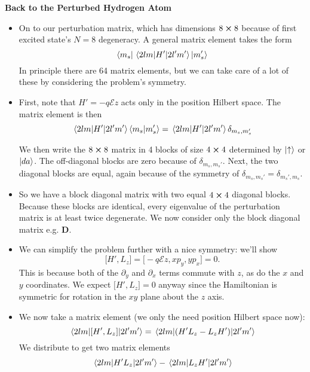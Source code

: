 \documentclass[11pt, a4paper]{article}
\newcommand{\Ham}{Hamiltonian\xspace}
\newcommand{\mat}[1]{\mathbf{#1}} %
\newcommand{\E}{\mathcal{E}}  %
\newcommand{\ua}{\uparrow}  %
\begin{document}
\textbf{Back to the Perturbed Hydrogen Atom}
\begin{itemize}
	\item On to our perturbation matrix, which has dimensions $ 8 \cross 8 $ because of first excited state's $ N = 8 $ degeneracy. A general matrix element takes the form
	\begin{equation*}
		\bra{m_{s}} \mel{2lm}{H'}{2l'm'} \ket{m_{s}'}
	\end{equation*}
	In principle there are 64 matrix elements, but we can take care of a lot of these by considering the problem's symmetry. 
	
	\item First, note that $ H' = - q \E z $ acts only in the position Hilbert space. The matrix element is then
	\begin{equation*}
		\mel{2lm}{H'}{2l'm'}\braket{m_{s}}{m_{s}'} = \mel{2lm}{H'}{2l'm'} \delta_{m_{s}, m_{s}'}
	\end{equation*}
	
	We then write the $ 8 \cross 8 $ matrix in 4 blocks  of size $ 4 \cross 4 $ determined by $ \ket{\ua} $ or $ \ket{da} $. The off-diagonal blocks are zero because of $ \delta_{m_{s}, m_{s}'} $. Next, the two diagonal blocks are equal, again because of the symmetry of $ \delta_{m_{s}, m_{s}'} = \delta_{m_{s}', m_{s}}$. 
	
	\item So we have a block diagonal matrix with two equal $ 4 \cross 4 $ diagonal blocks. Because these blocks are identical, every eigenvalue of the perturbation matrix is at least twice degenerate. We now consider only the block diagonal matrix e.g. $ \mat{D} $. 
	
	\item We can simplify the problem further with a nice symmetry: we'll show
	\begin{equation*}
		\big[H', L_{z}\big] = \big[- q \E z, xp_{y}, yp_{x}\big] = 0.
	\end{equation*}
	This is because both of the $ \partial_{y} $ and $ \partial_{x} $ terms commute with $ z $, as do the $ x $ and $ y $ coordinates. We expect $ \big[H', L_{z}\big] = 0 $ anyway since the \Ham is symmetric for rotation in the $ xy $ plane about the $ z $ axis. 
	
	\item We now take a matrix element (we only the need position Hilbert space now):
	\begin{equation*}
		\mel{2lm}{[H', L_{z}]}{2l'm'} = \mel{2lm}{(H' L_{z} - L_{z}H')}{2l'm'}
	\end{equation*}
	We distribute to get two matrix elements
	\begin{equation*}
		\mel{2lm}{H'L_{z}}{2l'm'} - \mel{2lm}{L_{z}H'}{2l'm'}
	\end{equation*}
	

\end{itemize}
\end{document}
